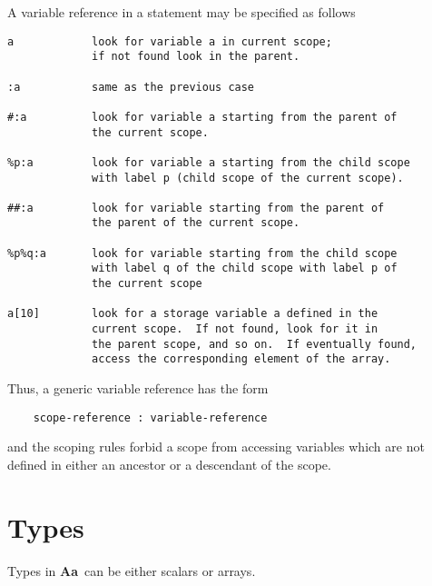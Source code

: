 \documentclass{article}
\newcommand{\Aa}{{\bf Aa}~}
\begin{document}
A variable reference in a statement may be specified 
as follows
\begin{verbatim}
a            look for variable a in current scope; 
             if not found look in the parent.

:a           same as the previous case

#:a          look for variable a starting from the parent of
             the current scope.

%p:a         look for variable a starting from the child scope 
             with label p (child scope of the current scope).

##:a         look for variable starting from the parent of
             the parent of the current scope.

%p%q:a       look for variable starting from the child scope 
             with label q of the child scope with label p of 
             the current scope

a[10]        look for a storage variable a defined in the 
             current scope.  If not found, look for it in
             the parent scope, and so on.  If eventually found, 
             access the corresponding element of the array.
\end{verbatim}
Thus, a generic variable reference has the form 
\begin{verbatim} 
    scope-reference : variable-reference 
\end{verbatim} 
and the scoping rules forbid a scope from accessing variables
which are not defined in either an ancestor or a descendant
of the scope.

\section{Types}

Types in \Aa can be either scalars or arrays.
\end{document}
